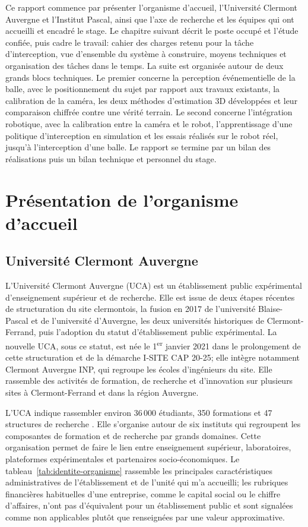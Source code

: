 \documentclass[a4paper,11pt]{report}
\begin{document}
Ce rapport commence par présenter l'organisme d'accueil, l'Université Clermont Auvergne et l'Institut Pascal, ainsi que l'axe de recherche et les équipes qui ont accueilli et encadré le stage. Le chapitre suivant décrit le poste occupé et l'étude confiée, puis cadre le travail: cahier des charges retenu pour la tâche d'interception, vue d'ensemble du système à construire, moyens techniques et organisation des tâches dans le temps. La suite est organisée autour de deux grands blocs techniques. Le premier concerne la perception événementielle de la balle, avec le positionnement du sujet par rapport aux travaux existants, la calibration de la caméra, les deux méthodes d'estimation 3D développées et leur comparaison chiffrée contre une vérité terrain. Le second concerne l'intégration robotique, avec la calibration entre la caméra et le robot, l'apprentissage d'une politique d'interception en simulation et les essais réalisés sur le robot réel, jusqu'à l'interception d'une balle. Le rapport se termine par un bilan des réalisations puis un bilan technique et personnel du stage.

\chapter{Présentation de l'organisme d'accueil}

\section{Université Clermont Auvergne}

L'Université Clermont Auvergne (UCA) est un établissement public expérimental d'enseignement supérieur et de recherche. Elle est issue de deux étapes récentes de structuration du site clermontois, la fusion en 2017 de l'université Blaise-Pascal et de l'université d'Auvergne, les deux universités historiques de Clermont-Ferrand, puis l'adoption du statut d'établissement public expérimental. La nouvelle UCA, sous ce statut, est née le 1\textsuperscript{er} janvier 2021 dans le prolongement de cette structuration et de la démarche I-SITE CAP 20-25; elle intègre notamment Clermont Auvergne INP, qui regroupe les écoles d'ingénieurs du site. Elle rassemble des activités de formation, de recherche et d'innovation sur plusieurs sites à Clermont-Ferrand et dans la région Auvergne.

L'UCA indique rassembler environ 36\,000 étudiants, 350 formations et 47 structures de recherche \cite{uca-universite}. Elle s'organise autour de six instituts qui regroupent les composantes de formation et de recherche par grands domaines. Cette organisation permet de faire le lien entre enseignement supérieur, laboratoires, plateformes expérimentales et partenaires socio-économiques. Le tableau~\ref{tab:identite-organisme} rassemble les principales caractéristiques administratives de l'établissement et de l'unité qui m'a accueilli; les rubriques financières habituelles d'une entreprise, comme le capital social ou le chiffre d'affaires, n'ont pas d'équivalent pour un établissement public et sont signalées comme non applicables plutôt que renseignées par une valeur approximative.
\end{document}
